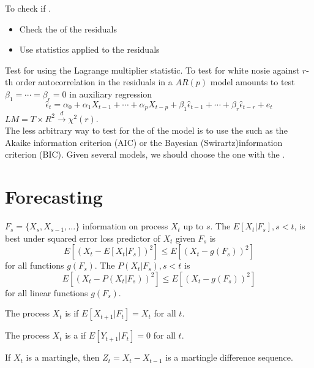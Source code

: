 To check if .
\begin{itemize}
    \item Check the  of the residuals
    \item Use  statistics applied to the residuals 
\end{itemize}
Test for  using the  Lagrange multiplier statistic.
To test for white nosie against $r$-th order autocorrelation in the residuals in a $AR(p)$ model amounts to test $\beta_1 = \cdots = \beta_r = 0$ in auxiliary regression 
\begin{equation*}
    \hat{\epsilon}_t = \alpha_0 + \alpha_1 X_{t-1} + \cdots + \alpha_p X_{t-p} + \beta_1\hat{\epsilon}_{t-1}+\cdots+\beta_r\hat{\epsilon}_{t-r}+e_t
\end{equation*}
$LM = T\times R^2\xrightarrow{d}\chi^2(r)$.\\

The less arbitrary way to test for the  of the model is to use the  such as the Akaike information criterion (AIC) or the Bayesian (Swirartz)information criterion (BIC).
Given several models, we should choose the one with the .

\section{Forecasting}

$F_s = \{X_s,X_{s-1},\ldots\}$ information on process $X_t$ up to $s$. The  $E[X_t|F_s], s<t$, is best under squared error loss predictor of $X_t$ given $F_s$ is
\begin{equation*}
    E[(X_t-E[X_t|F_s])^2] \leq E[(X_t-g(F_s))^2]
\end{equation*}
for all functions $g(F_s)$. 
The  $P(X_t|F_s), s<t$ is 
\begin{equation*}
    E[(X_t-P(X_t|F_s))^2] \leq E[(X_t-g(F_s))^2]
\end{equation*}
for all linear functions $g(F_s)$.

\begin{definition}
    The process $X_t$ is  if $E[X_{t+1}|F_t] = X_t$ for all $t$.
\end{definition}
\begin{definition}
    The process $X_t$ is a  if $E[Y_{t+1}|F_t] = 0$ for all $t$.
\end{definition}
If $X_t$ is a martingle, then $Z_t = X_t - X_{t-1}$ is a martingle difference sequence.\\

